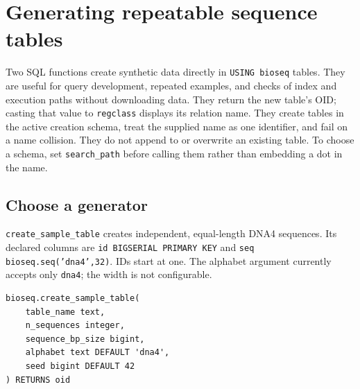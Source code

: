 \section{Generating repeatable sequence tables}
\label{sec:appendix-sequence-generation}
\label{sec:app-sequence-generation}

Two SQL functions create synthetic data directly in \texttt{USING bioseq}
tables. They are useful for query development, repeated examples, and checks
of index and execution paths without downloading data. They return the new
table's OID; casting that value to \texttt{regclass} displays its relation
name. They create tables in the active creation schema, treat the supplied
name as one identifier, and fail on a name collision. They do not append to
or overwrite an existing table. To choose a schema, set \texttt{search\_path}
before calling them rather than embedding a dot in the name.

\subsection{Choose a generator}

\texttt{create\_sample\_table} creates independent, equal-length DNA4
sequences. Its declared columns are \texttt{id BIGSERIAL PRIMARY KEY} and
\texttt{seq bioseq.seq('dna4',32)}. IDs start at one. The alphabet argument
currently accepts only \texttt{dna4}; the width is not configurable.
\par\noindent\begin{minipage}{\linewidth}
\begin{lstlisting}[style=bioseq-appendix-sql]
bioseq.create_sample_table(
    table_name text,
    n_sequences integer,
    sequence_bp_size bigint,
    alphabet text DEFAULT 'dna4',
    seed bigint DEFAULT 42
) RETURNS oid
\end{lstlisting}
\end{minipage}

